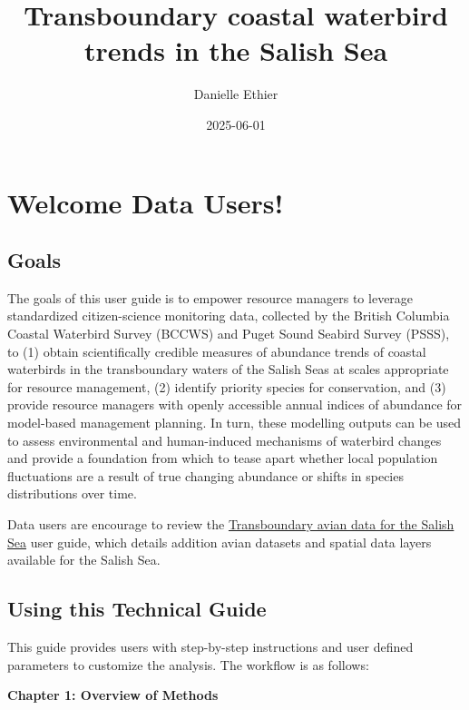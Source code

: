 \documentclass[
  letterpaper,
  DIV=11,
  numbers=noendperiod]{scrreprt}
\title{Transboundary coastal waterbird trends in the Salish Sea}
\author{Danielle Ethier}
\date{2025-06-01}
\renewcommand*\contentsname{Table of contents}
\newcommand\contentsname{Table of contents}
\begin{document}
\maketitle

\renewcommand*\contentsname{Table of contents}
{
\hypersetup{linkcolor=}
\setcounter{tocdepth}{2}
\tableofcontents
}


\chapter{Welcome Data Users!}\label{welcome-data-users}

\section{Goals}\label{0.1Intro}

The goals of this user guide is to empower resource managers to leverage
standardized citizen-science monitoring data, collected by the British
Columbia Coastal Waterbird Survey (BCCWS) and Puget Sound Seabird Survey
(PSSS), to (1) obtain scientifically credible measures of abundance
trends of coastal waterbirds in the transboundary waters of the Salish
Seas at scales appropriate for resource management, (2) identify
priority species for conservation, and (3) provide resource managers
with openly accessible annual indices of abundance for model-based
management planning. In turn, these modelling outputs can be used to
assess environmental and human-induced mechanisms of waterbird changes
and provide a foundation from which to tease apart whether local
population fluctuations are a result of true changing abundance or
shifts in species distributions over time.

Data users are encourage to review the
\href{https://birdscanada.github.io/TransboundaryData_SalishSea/}{Transboundary
avian data for the Salish Sea} user guide, which details addition avian
datasets and spatial data layers available for the Salish Sea.

\section{Using this Technical Guide}\label{0.2Intro}

This guide provides users with step-by-step instructions and user
defined parameters to customize the analysis. The workflow is as
follows:

\textbf{Chapter 1: Overview of Methods}
\end{document}
